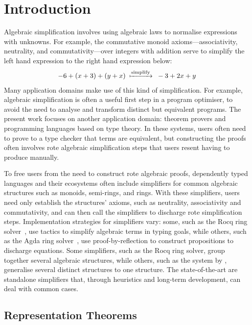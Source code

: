 \section{Introduction}
Algebraic simplification involves using algebraic laws to normalise
expressions with unknowns. For example, the commutative monoid
axioms---associativity, neutrality, and commutativity---over
integers with addition serve to
simplify the left hand expression to the right hand expression below:
%
\[-6 + (x+3)+(y+x)
\;{}\xmapsto{\text{simplify}}{}\;
-3+2x+y
\]
%
Many application domains make use of this kind of simplification.
%
For example, algebraic simplification is often a useful first step in
a program optimiser, to avoid the need to analyse and transform
distinct but equivalent programs.
%
The present work focuses on another application domain: theorem
provers and programming languages based on type theory.
%
In these systems, users often need to prove to a type checker that
terms are equivalent, but constructing the proofs often involves rote
algebraic simplification steps that users resent having to produce
manually.

To free users from the need to construct rote algebraic proofs,
de\-pen\-dent\-ly ty\-ped languages and their ecosystems often
include simplifiers for common algebraic structures such as
monoids, semi-rings, and rings.
%
With these simplifiers, users need only establish the structures'
axioms, such as neutrality, associativity and commutativity, and can
then call the simplifiers to discharge rote simplification steps.
%
Implementation strategies for simplifiers vary:  some,
such as the Rocq ring solver~\cite{coq-ref-man-8:ring-solver},
use tactics to simplify  algebraic terms in typing goals,
while others, such as the Agda ring solver~\cite{kidney:ring-solver},
use proof-by-reflection to construct propositions to discharge
equations.
Some simplifiers, such as the Rocq ring solver, group together several algebraic
structures, while others, such as the system by \citet{gregoire-mahboubi:commutative-ring-done-right}, generalise several distinct structures to one
structure.
The
state-of-the-art are standalone simplifiers that, through heuristics
and long-term development, can deal with common cases.

\subsection{Representation Theorems}

